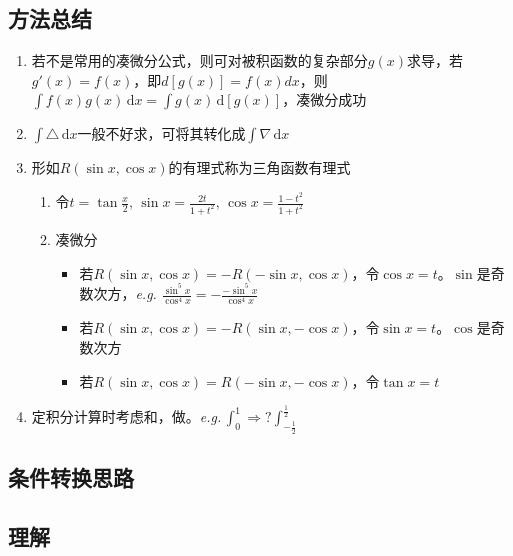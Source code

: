 \documentclass[a4paper,12pt]{article}
\begin{document}
    \subsection{方法总结}

    \begin{enumerate}
        \item 若不是常用的凑微分公式，则可对被积函数的复杂部分$g(x)$求导，若$g'(x) = f(x)$，即$d[g(x)] = f(x)dx$，则$\int f(x)g(x)\,\mathrm{d}x = \int g(x)\,\mathrm{d}[g(x)]$，凑微分成功
        \item $\int \triangle\,\mathrm{d}x$一般不好求，可将其转化成$\int \nabla\,\mathrm{d}x$
        \item 形如$R(\sin x, \cos x)$的有理式称为三角函数有理式
        \begin{enumerate}
            \item 令$t = \tan \displaystyle\frac{x}{2},\, \sin x = \displaystyle\frac{2t}{1 + t^2},\, \cos x = \displaystyle\frac{1-t^2}{1+t^2}$
            \item 凑微分
            \begin{itemize}
                \item 若$R(\sin x, \cos x) = -R(-\sin x, \cos x)$，令$\cos x = t$。$\sin$是奇数次方，\emph{e.g.} $\displaystyle\frac{\sin^5 x}{\cos^4 x} = -\displaystyle\frac{-\sin^5 x}{\cos^4 x}$
                \item 若$R(\sin x, \cos x) = -R(\sin x, -\cos x)$，令$\sin x = t$。$\cos$是奇数次方
                \item 若$R(\sin x, \cos x) = R(-\sin x, -\cos x)$，令$\tan x = t$
            \end{itemize}
        \end{enumerate}
        \item 定积分计算时考虑{\color{customgreen}{奇偶性}}和{\color{customgreen}{周期性}}，做{\color{customgreen}{平移代换}}。\emph{e.g.}\,$\int_0^1 \Rightarrow? \int_{-\frac{1}{2}}^{\frac{1}{2}}$

    \end{enumerate}

    \subsection{条件转换思路}

    \begin{enumerate}
    \end{enumerate}

    \subsection{理解}

    \begin{enumerate}
    \end{enumerate}
\end{document}

